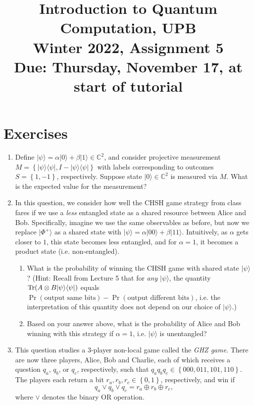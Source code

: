 \documentclass{article}
\newcommand{\bra}[1]{\langle #1|}
\newcommand{\ket}[1]{|#1\rangle}
\newcommand{\ketbra}[2]{\ket{#1}{\bra{#2}}}
\newcommand{\trace}{{\rm Tr}}
\newcommand{\set}[1]{{\left\{#1\right\}}}    %
\newcommand{\complex}{{\mathbb C}}
\begin{document}
\title{\vspace{-10mm}Introduction to Quantum Computation, UPB\\Winter 2022, Assignment 5\\{\large Due: Thursday, November 17, at start of tutorial}}
\date{}
\maketitle



\section{Exercises}
\begin{enumerate}
    \item Define $\ket{\psi}=\alpha\ket{0}+\beta\ket{1}\in\complex^2$, and consider projective measurement $M=\set{\ketbra{\psi}{\psi},I-\ketbra{\psi}{\psi}}$ with labels corresponding to outcomes $S=\set{1,-1}$, respectively. Suppose state $\ket{0}\in\complex^2$ is measured via $M$. What is the expected value for the measurement?
    \item In this question, we consider how well the CHSH game strategy from class fares if we use a \emph{less} entangled state as a shared resource between Alice and Bob. Specifically, imagine we use the same observables as before, but now we replace $\ket{\Phi^+}$ as a shared state with $\ket{\psi}=\alpha\ket{00}+\beta\ket{11}$. Intuitively, as $\alpha$ gets closer to $1$, this state becomes less entangled, and for $\alpha=1$, it becomes a product state (i.e. non-entangled).
        \begin{enumerate}
            \item What is the probability of winning the CHSH game with shared state $\ket{\psi}$? (Hint: Recall from Lecture 5 that for \emph{any} $\ket{\psi}$, the quantity $\trace(A\otimes B\ketbra{\psi}{\psi})$ equals $\Pr(\text{output same bits})-\Pr(\text{output different bits})$, i.e. the interpretation of this quantity does not depend on our choice of $\ket{\psi}$.)
            \item Based on your answer above, what is the probability of Alice and Bob winning with this strategy if $\alpha=1$, i.e. $\ket{\psi}$ is unentangled?
        \end{enumerate}

    \item This question studies a $3$-player non-local game called the \emph{GHZ game}. There are now three players, Alice, Bob and Charlie, each of which receives a question $q_a$, $q_b$, or $q_c$, respectively, such that $q_aq_bq_c\in\set{000,011,101,110}$. The players each return a bit $r_a,r_b,r_c\in\set{0,1}$, respectively, and win if
        \[
            q_a\vee q_b\vee q_c = r_a\oplus r_b\oplus r_c,
        \]
        where $\vee$ denotes the binary OR operation.


\end{enumerate}
\end{document}
